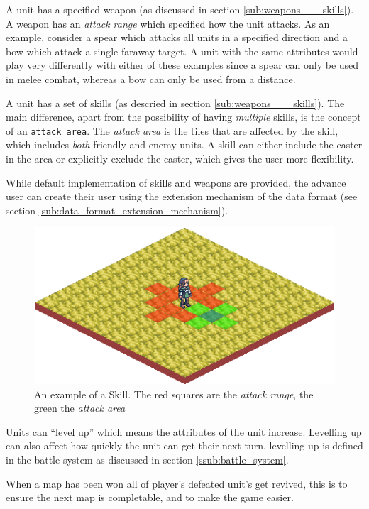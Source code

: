 A unit has a  specified weapon (as discussed in section \ref{sub:weapons___skills}).  A weapon has an \emph{attack range} which specified how the unit attacks.  As an example, consider a spear which attacks all units in a specified direction and a bow which attack a single faraway target. A unit with the same attributes would play very differently with either of these examples since a spear can only be used in melee combat, whereas a bow can only be used from a distance.

A unit has a set of skills (as descried in section \ref{sub:weapons___skills}). The main difference, apart from the possibility of having \emph{multiple} skills, is the concept of an \texttt{attack area}.  The \emph{attack area} is the tiles that are affected by the skill, which includes \emph{both} friendly and enemy units. A skill can either include the caster in the area or explicitly exclude the caster, which gives the user more flexibility.

While default implementation of skills and weapons are provided, the advance user can create their user using the extension mechanism of the data format (see section \ref{sub:data_format_extension_mechanism}).

\begin{figure}[htbp]
	\centering
 		\includegraphics[scale=0.5]{figures/skill.png}
	\caption{An example of a Skill. The red squares are the \emph{attack range}, the green the \emph{attack area}}
	\label{fig:figures_engine_Skills}
\end{figure}

Units can ``level up'' which means the attributes  of the unit increase.  Levelling up can also affect how quickly the unit can get their next turn. levelling up is defined in the battle system as discussed in section \ref{ssub:battle_system}.

When a map has been won all of player's defeated unit's get revived, this is to ensure the next map is completable, and to make the game easier. 

